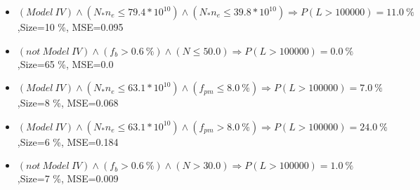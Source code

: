 \documentclass[numbered]{CSL}
\begin{document}
\begin{itemize}
\item $(Model~IV) \land (N_* n_e \leq 79.4 * 10^{10}) \land (N_* n_e \leq 39.8 * 10^{10}) \Rightarrow P(L > 100 000) = 11.0~\%$,\hfill Size=10 \%, MSE=0.095
\item $(not~Model~IV) \land (f_b > 0.6~\%) \land (N \leq 50.0) \Rightarrow P(L > 100 000) = 0.0~\%$,\hfill Size=65 \%, MSE=0.0
\item $(Model~IV) \land (N_* n_e \leq 63.1 * 10^{10}) \land (f_{pm} \leq 8.0~\%) \Rightarrow P(L > 100 000) = 7.0~\%$,\hfill Size=8 \%, MSE=0.068
\item $(Model~IV) \land (N_* n_e \leq 63.1 * 10^{10}) \land (f_{pm} > 8.0~\%) \Rightarrow P(L > 100 000) = 24.0~\%$,\hfill Size=6 \%, MSE=0.184
\item $(not~Model~IV) \land (f_b > 0.6~\%) \land (N > 30.0) \Rightarrow P(L > 100 000) = 1.0~\%$,\hfill Size=7 \%, MSE=0.009
\end{itemize}
\end{document}
